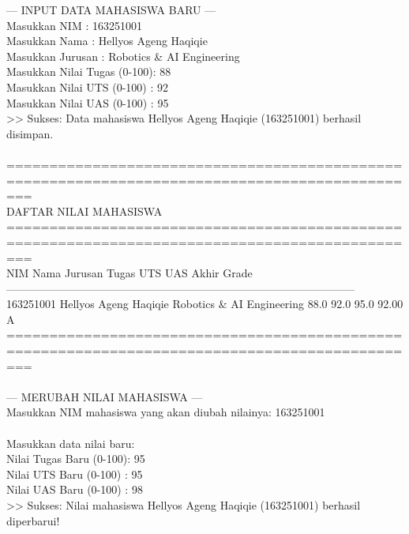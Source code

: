 \documentclass[12pt,a4paper]{article}
\begin{document}
\begin{tcolorbox}[colback=black!90!white,coltext=green!90!white,fontupper=\ttfamily\footnotesize,title=\textbf{Terminal Output Python: Input, Tampil Nilai, \& Merubah Nilai}]
--- INPUT DATA MAHASISWA BARU ---\\
Masukkan NIM     : 163251001\\
Masukkan Nama    : Hellyos Ageng Haqiqie\\
Masukkan Jurusan : Robotics \& AI Engineering\\
Masukkan Nilai Tugas (0-100): 88\\
Masukkan Nilai UTS (0-100)  : 92\\
Masukkan Nilai UAS (0-100)  : 95\\
>> Sukses: Data mahasiswa Hellyos Ageng Haqiqie (163251001) berhasil disimpan.\\
\\
===============================================================================================\\
                              DAFTAR NILAI MAHASISWA                              \\
===============================================================================================\\
NIM           Nama                  Jurusan                        Tugas     UTS     UAS     Akhir  Grade\\
-----------------------------------------------------------------------------------------------\\
163251001     Hellyos Ageng Haqiqie Robotics \& AI Engineering      88.0    92.0    95.0     92.00      A\\
===============================================================================================\\
\\
--- MERUBAH NILAI MAHASISWA ---\\
Masukkan NIM mahasiswa yang akan diubah nilainya: 163251001\\
\\
Masukkan data nilai baru:\\
Nilai Tugas Baru (0-100): 95\\
Nilai UTS Baru (0-100)  : 95\\
Nilai UAS Baru (0-100)  : 98\\
>> Sukses: Nilai mahasiswa Hellyos Ageng Haqiqie (163251001) berhasil diperbarui!\\
\\

\end{tcolorbox}
\end{document}
